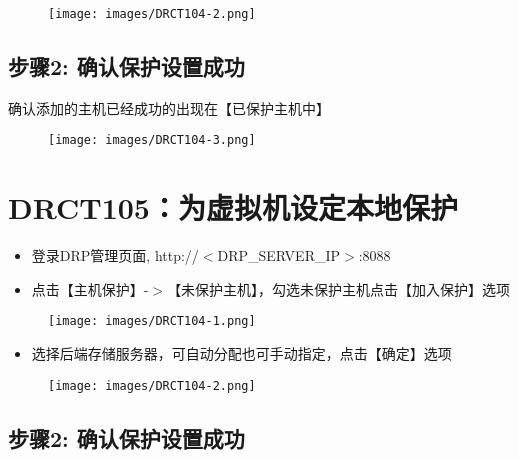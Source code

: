 \begin{figure}[htbp]
\centering
\texttt{[image: images/DRCT104-2.png]}
\end{figure}

\subsection{步骤2: 确认保护设置成功}
\label{步骤2:确认保护设置成功}

确认添加的主机已经成功的出现在【已保护主机中】

\begin{figure}[htbp]
\centering
\texttt{[image: images/DRCT104-3.png]}
\end{figure}

\section{DRCT105：为虚拟机设定本地保护}
\label{drct105：为虚拟机设定本地保护}

\begin{itemize}
\item 登录DRP管理页面, http:\slash \slash $<$DRP\_SERVER\_IP$>$:8088

\item 点击【主机保护】-$>$【未保护主机】，勾选未保护主机点击【加入保护】选项

\end{itemize}

\begin{figure}[htbp]
\centering
\texttt{[image: images/DRCT104-1.png]}
\end{figure}

\begin{itemize}
\item 选择后端存储服务器，可自动分配也可手动指定，点击【确定】选项

\end{itemize}

\begin{figure}[htbp]
\centering
\texttt{[image: images/DRCT104-2.png]}
\end{figure}

\subsection{步骤2: 确认保护设置成功}
\label{步骤2:确认保护设置成功}

